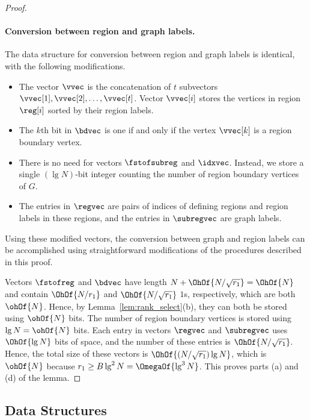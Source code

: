 \begin{proof}
  \paragraph{Conversion between region and graph labels.}

  The data structure for conversion between region and graph labels is
  identical, with the following modifications.
  \begin{itemize}
  \item The vector $\vvec$ is the concatenation of $t$ subvectors
    $\vvec[1], \vvec[2], \dots, \vvec[t]$.
    Vector $\vvec[i]$ stores the vertices in region $\reg[i]$ sorted
    by their region labels.
  \item The $k$th bit in $\bdvec$ is one if and only if the vertex
    $\vvec[k]$ is a region boundary vertex.
  \item There is no need for vectors $\fstofsubreg$ and $\idxvec$.
    Instead, we store a single $(\lg N)$-bit integer counting the number
    of region boundary vertices of $G$.
  \item The entries in $\regvec$ are pairs of indices of defining
    regions and region labels in these regions, and the entries in
    $\subregvec$ are graph labels.
  \end{itemize}
  Using these modified vectors, the conversion between graph and region labels
  can be accomplished using straightforward modifications of the procedures
  described in this proof.

  Vectors $\fstofreg$ and $\bdvec$ have length
  $N + \OhOf{N / \sqrt{\regsz}} = \OhOf{N}$ and contain $\OhOf{N / \regsz}$ and
  $\OhOf{N / \sqrt{\regsz}}$ $1$s, respectively, which are both $\ohOf{N}$.
  Hence, by Lemma~\ref{lem:rank_select}(b), they can both be stored using
  $\ohOf{N}$ bits.
  The number of region boundary vertices is stored using $\lg N = \ohOf{N}$
  bits.
  Each entry in vectors $\regvec$ and $\subregvec$ uses $\OhOf{\lg N}$ bits
  of space, and the number of these entries is $\OhOf{N / \sqrt{\regsz}}$.
  Hence, the total size of these vectors is $\OhOf{(N / \sqrt{\regsz}) \lg N}$,
  which is $\ohOf{N}$ because $\regsz \ge B \lg^2 N = \OmegaOf{\lg^3 N}$.
  This proves parts (a) and (d) of the lemma.
\end{proof}

\subsection{Data Structures}\label{sec:datastructs}

